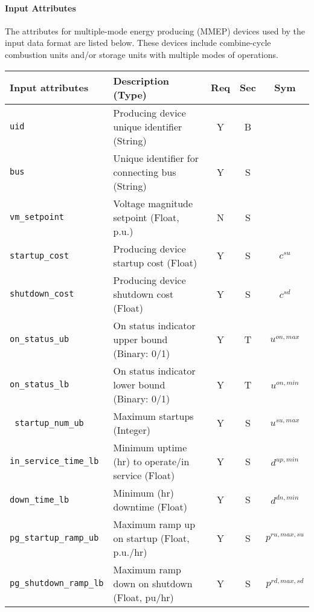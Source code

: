 \documentclass{article}
\begin{document}
\paragraph{Input Attributes} The attributes for 
multiple-mode energy producing (MMEP) devices used by the input data format are listed below.
These devices include combine-cycle combustion units and/or storage units with multiple modes of operations. 

\begin{center}
\small
\begin{tabular}{ l | l | c | c | c |}
Input attributes & Description (Type) & Req & Sec & Sym\\
\hline
  {\tt uid} & Producing device unique identifier (String) & Y & B &  \\
  {\tt bus} & Unique identifier for connecting bus (String)& Y & S & \\
  {\tt vm\_setpoint} & Voltage magnitude setpoint (Float, p.u.) & N & S & \\
  {\tt startup\_cost} & Producing device startup cost (Float) & Y & S & $c^{su}$\\
  {\tt shutdown\_cost} & Producing device shutdown cost (Float) & Y & S & $c^{sd}$\\  
  {\tt on\_status\_ub} & On status indicator upper bound (Binary: 0/1) & Y & T & $u^{on,max}$\\
  {\tt on\_status\_lb} & On status indicator lower bound (Binary: 0/1) & Y & T & $u^{on,min}$\\
  {\tt\color{red} startup\_num\_ub} & Maximum startups (Integer) & Y & S & $u^{su,max}$\\  
  {\tt in\_service\_time\_lb} & Minimum uptime (hr) to operate/in service (Float) & Y & S & $d^{up,min}$\\
  {\tt down\_time\_lb} & Minimum (hr) downtime (Float) & Y & S & $d^{dn,min}$\\
  {\tt pg\_startup\_ramp\_ub} & Maximum ramp up on startup (Float, p.u./hr) & Y & S & $p^{ru,max,su}$\\
  {\tt pg\_shutdown\_ramp\_lb}   & Maximum ramp down on shutdown (Float, pu/hr) & Y & S & $p^{rd,max,sd}$\\


\end{tabular}
\end{center}
\end{document}
